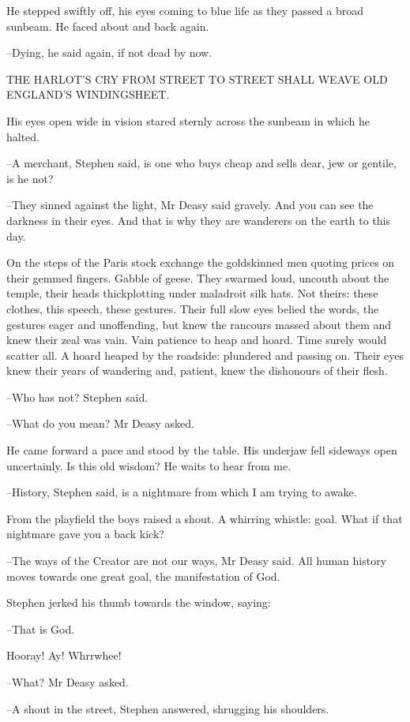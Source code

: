 He stepped swiftly off, his eyes coming to blue life as they passed a
broad sunbeam. He faced about and back again.

--Dying, he said again, if not dead by now.


    THE HARLOT'S CRY FROM STREET TO STREET
    SHALL WEAVE OLD ENGLAND'S WINDINGSHEET.


His eyes open wide in vision stared sternly across the sunbeam in
which he halted.

--A merchant, Stephen said, is one who buys cheap and sells dear, jew or
gentile, is he not?

--They sinned against the light, Mr Deasy said gravely. And you can see
the darkness in their eyes. And that is why they are wanderers on the
earth to this day.

On the steps of the Paris stock exchange the goldskinned men quoting
prices on their gemmed fingers. Gabble of geese. They swarmed loud,
uncouth about the temple, their heads thickplotting under maladroit silk
hats. Not theirs: these clothes, this speech, these gestures. Their full
slow eyes belied the words, the gestures eager and unoffending, but knew
the rancours massed about them and knew their zeal was vain. Vain patience
to heap and hoard. Time surely would scatter all. A hoard heaped by the
roadside: plundered and passing on. Their eyes knew their years of
wandering and, patient, knew the dishonours of their flesh.

--Who has not? Stephen said.

--What do you mean? Mr Deasy asked.

He came forward a pace and stood by the table. His underjaw fell
sideways open uncertainly. Is this old wisdom? He waits to hear from me.

--History, Stephen said, is a nightmare from which I am trying to awake.

From the playfield the boys raised a shout. A whirring whistle: goal.
What if that nightmare gave you a back kick?

--The ways of the Creator are not our ways, Mr Deasy said. All human
history moves towards one great goal, the manifestation of God.

Stephen jerked his thumb towards the window, saying:

--That is God.

Hooray! Ay! Whrrwhee!

--What? Mr Deasy asked.

--A shout in the street, Stephen answered, shrugging his shoulders.

